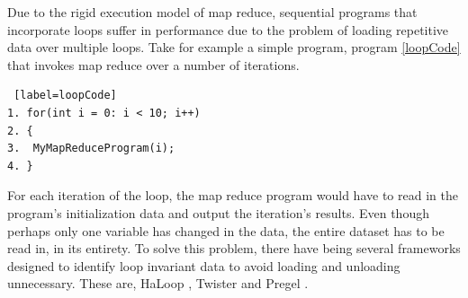 \documentclass[10pt,twocolumn]{IEEEtran11}
\begin{document}
Due to the rigid execution model of map reduce, sequential programs that incorporate loops suffer in performance due to the problem of loading repetitive data over multiple loops.  Take for example a simple program, program \ref{loopCode} that invokes map reduce over a number of iterations.

\begin{lstlisting} [label=loopCode]
1. for(int i = 0: i < 10; i++)
2. {
3. 	MyMapReduceProgram(i);
4. }
\end{lstlisting}

For each iteration of the loop, the map reduce program would have to read in the program's initialization data and output the iteration's results.  Even though perhaps only one variable has changed in the data, the entire dataset has to be read in, in its entirety.  To solve this problem, there have being several frameworks designed to identify loop invariant data to avoid loading and unloading unnecessary.   These are, HaLoop \cite{bu2010haloop}, Twister \cite{ekanayake2010twister} and Pregel \cite{malewicz2010pregel}. 
























\end{document}
